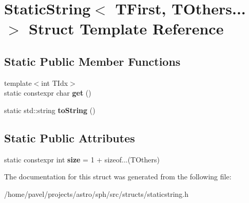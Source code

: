 \hypertarget{structStaticString_3_01TFirst_00_01TOthers_8_8_8_01_4}{}\section{Static\+String$<$ T\+First, T\+Others... $>$ Struct Template Reference}
\label{structStaticString_3_01TFirst_00_01TOthers_8_8_8_01_4}
\subsection*{Static Public Member Functions}
\begin{DoxyCompactItemize}
\item 
\hypertarget{structStaticString_3_01TFirst_00_01TOthers_8_8_8_01_4_a313d78ac9cc1d06a006f960967c9fdf4}{}\label{structStaticString_3_01TFirst_00_01TOthers_8_8_8_01_4_a313d78ac9cc1d06a006f960967c9fdf4} 
{\footnotesize template$<$int T\+Idx$>$ }\\static constexpr char {\bfseries get} ()
\item 
\hypertarget{structStaticString_3_01TFirst_00_01TOthers_8_8_8_01_4_a2f3b70e3e3b9855619bd8048a4fbdbfb}{}\label{structStaticString_3_01TFirst_00_01TOthers_8_8_8_01_4_a2f3b70e3e3b9855619bd8048a4fbdbfb} 
static std\+::string {\bfseries to\+String} ()
\end{DoxyCompactItemize}
\subsection*{Static Public Attributes}
\begin{DoxyCompactItemize}
\item 
\hypertarget{structStaticString_3_01TFirst_00_01TOthers_8_8_8_01_4_a617dcae7535d1d69f53f46a13751594d}{}\label{structStaticString_3_01TFirst_00_01TOthers_8_8_8_01_4_a617dcae7535d1d69f53f46a13751594d} 
static constexpr int {\bfseries size} = 1 + sizeof...(T\+Others)
\end{DoxyCompactItemize}


The documentation for this struct was generated from the following file\+:\begin{DoxyCompactItemize}
\item 
/home/pavel/projects/astro/sph/src/structs/staticstring.\+h\end{DoxyCompactItemize}
